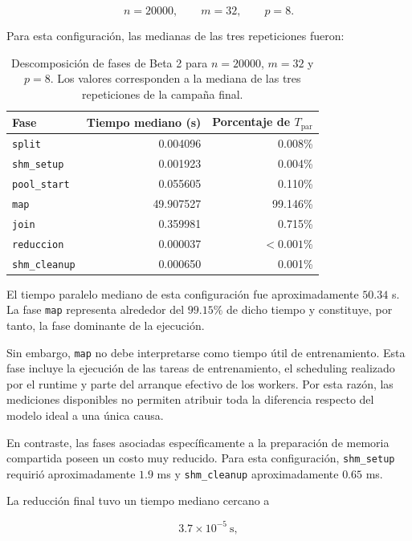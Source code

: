 \documentclass[11pt,a4paper]{article}
\begin{document}
\begin{equation}
    n=20000,\qquad m=32,\qquad p=8.
\end{equation}

Para esta configuración, las medianas de las tres repeticiones fueron:

\begin{table}[H]
\centering
\small
\begin{tabular}{lrr}
\toprule
Fase & Tiempo mediano (s) & Porcentaje de $T_{\mathrm{par}}$ \\
\midrule
\texttt{split}        & 0.004096 & 0.008\% \\
\texttt{shm\_setup}   & 0.001923 & 0.004\% \\
\texttt{pool\_start}  & 0.055605 & 0.110\% \\
\texttt{map}          & 49.907527 & 99.146\% \\
\texttt{join}         & 0.359981 & 0.715\% \\
\texttt{reduccion}    & 0.000037 & $<0.001\%$ \\
\texttt{shm\_cleanup} & 0.000650 & 0.001\% \\
\bottomrule
\end{tabular}
\caption{Descomposición de fases de Beta 2 para $n=20000$, $m=32$ y $p=8$.
Los valores corresponden a la mediana de las tres repeticiones de la campaña final.}
\label{tab:fases-beta2}
\end{table}

El tiempo paralelo mediano de esta configuración fue aproximadamente
$50.34$ s. La fase \texttt{map} representa alrededor del $99.15\%$ de dicho
tiempo y constituye, por tanto, la fase dominante de la ejecución.

Sin embargo, \texttt{map} no debe interpretarse como tiempo útil de
entrenamiento. Esta fase incluye la ejecución de las tareas de entrenamiento,
el scheduling realizado por el runtime y parte del arranque efectivo de los
workers. Por esta razón, las mediciones disponibles no permiten atribuir toda
la diferencia respecto del modelo ideal a una única causa.

En contraste, las fases asociadas específicamente a la preparación de memoria
compartida poseen un costo muy reducido. Para esta configuración,
\texttt{shm\_setup} requirió aproximadamente $1.9$ ms y
\texttt{shm\_cleanup} aproximadamente $0.65$ ms.

La reducción final tuvo un tiempo mediano cercano a

\begin{equation}
    3.7\times10^{-5}\ \mathrm{s},
\end{equation}
\end{document}
